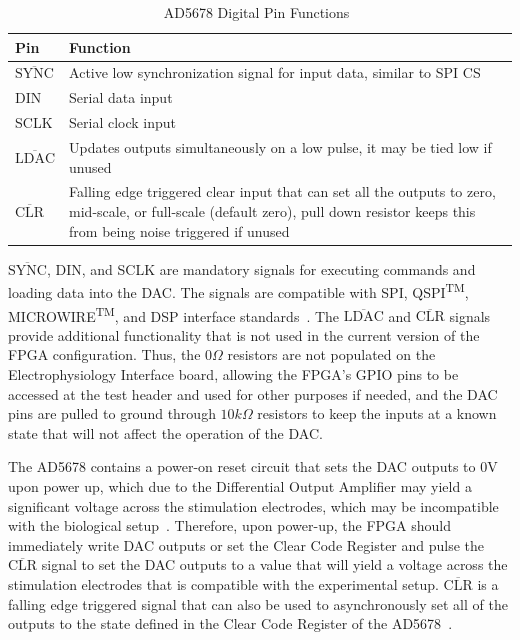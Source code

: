 \renewcommand{\arraystretch}{1.3}
\begin{table}[h]
\centering
\begin{tabular}{|l|p{4in}|}
\hline
Pin	& Function\\
\hline
$\overline{\mathrm{SYNC}}$	& Active low synchronization signal for input data, similar to SPI CS\\
\hline
DIN	& Serial data input\\
\hline
SCLK	& Serial clock input\\
\hline
$\overline{\mathrm{LDAC}}$	& Updates outputs simultaneously on a low pulse, it may be tied low if unused\\
\hline
$\overline{\mathrm{CLR}}$	& Falling edge triggered clear input that can set all the outputs to zero, mid-scale, or full-scale (default zero), pull down resistor keeps this from being noise triggered if unused\\
\hline
\end{tabular}
\caption{AD5678 Digital Pin Functions~\cite{AD5678ds}\label{tab:AD5678Pins} }

\end{table}
\renewcommand{\arraystretch}{1.0}

$\overline{\mathrm{SYNC}}$, DIN, and SCLK are mandatory signals for executing commands and loading data into the DAC.  The signals are compatible with SPI\textsuperscript{\textregistered}, QSPI\textsuperscript{TM}, MICROWIRE\textsuperscript{TM}, and DSP interface standards~\cite{AD5678ds}.  The $\overline{\mathrm{LDAC}}$ and $\overline{\mathrm{CLR}}$ signals provide additional functionality that is not used in the current version of the FPGA configuration.  Thus, the $0\unit{\Omega}$ resistors are not populated on the Electrophysiology Interface board, allowing the FPGA's GPIO pins to be accessed at the test header and used for other purposes if needed, and the DAC pins are pulled to ground through $10\unit{k\Omega}$ resistors to keep the inputs at a known state that will not affect the operation of the DAC.

The AD5678 contains a power-on reset circuit that sets the DAC outputs to 0V upon power up, which due to the Differential Output Amplifier may yield a significant voltage across the stimulation electrodes, which may be incompatible with the biological setup~\cite{AD5678ds}.  Therefore, upon power-up, the FPGA should immediately write DAC outputs or set the Clear Code Register and pulse the $\overline{\mathrm{CLR}}$ signal to set the DAC outputs to a value that will yield a voltage across the stimulation electrodes that is compatible with the experimental setup.  $\overline{\mathrm{CLR}}$ is a falling edge triggered signal that can also be used to asynchronously set all of the outputs to the state defined in the Clear Code Register of the AD5678~\cite{AD5678ds}.
